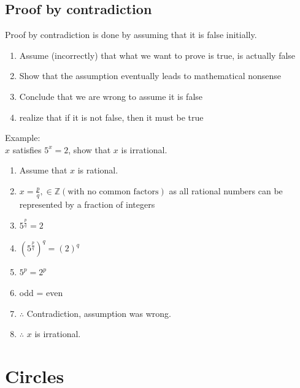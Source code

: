 \documentclass{book}
\begin{document}
\section{Proof by contradiction}
Proof by contradiction is done by assuming that it is false initially.
\begin{enumerate}
	\item Assume (incorrectly) that what we want to prove is true, is actually false
	\item Show that the assumption eventually leads to mathematical nonsense
	\item Conclude that we are wrong to assume it is false
	\item realize that if it is not false, then it must be true
\end{enumerate}
Example:\\
$x$ satisfies $5^x = 2$, show that $x$ is irrational.
\begin{enumerate}
	\item Assume that $x$ is rational.
	\item $x = \frac{p}{q}, \in \mathbb{Z} (\text{with no common factors})$ as all rational numbers can be represented by a fraction of integers
	\item $5^{\frac{p}{q}} = 2$
	\item $(5^{\frac{p}{q}})^q = (2)^q$
	\item $5^p = 2^p$
	\item odd = even
	\item $\therefore$ Contradiction, assumption was wrong.
	\item $\therefore$ $x$ is irrational.
\end{enumerate}

\chapter{Circles}
\end{document}
